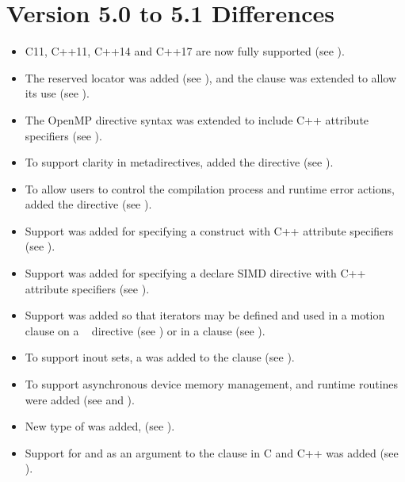 \section{Version 5.0 to 5.1 Differences}
\label{sec:Version 5.0 to 5.1 Differences}
\begin{itemize}
\item C11, C++11, C++14 and C++17 are now fully supported (see
      ).

\item The  reserved locator was added (see ),
      and the  clause was extended to allow its use (see ).

\item The OpenMP directive syntax was extended to include C++ attribute
      specifiers (see ).

\item To support clarity in metadirectives, added the  
      directive (see ).

\item To allow users to control the compilation process and runtime error 
      actions, added the  directive 
      (see ).

\item Support was added for specifying a  construct with C++ 
      attribute specifiers (see ).

\item Support was added for specifying a declare SIMD directive with C++ 
      attribute specifiers (see ).

\item Support was added so that iterators may be defined and used in a 
      motion clause on a ~ directive (see 
      ) or in a  clause 
      (see ).

\item To support inout sets, a   was
      added to the  clause (see ).

\item To support asynchronous device memory management,
       and
       runtime routines were added (see
       and
      ).

\item New   type of  
      was added, (see ).

\item Support for  and  as an argument to 
      the  clause in C and C++ was added (see  
      ).
\end{itemize}


